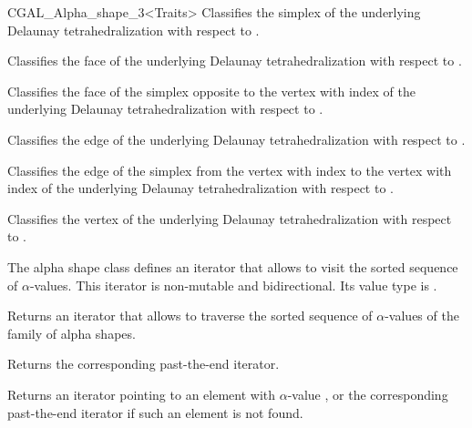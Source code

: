 \begin{ccClassTemplate} {CGAL_Alpha_shape_3<Traits>}
{Classifies the simplex  of the underlying Delaunay tetrahedralization with respect to \ccVar.}

{Classifies the face  of the underlying Delaunay tetrahedralization with respect to \ccVar.}

{Classifies the face of the simplex  opposite to the vertex with index  of the underlying Delaunay tetrahedralization with respect to \ccVar.}

{Classifies the edge  of the underlying Delaunay tetrahedralization with respect to \ccVar.}

{Classifies the edge of the simplex  from the vertex with index  to the vertex with index  of the underlying Delaunay tetrahedralization with respect to \ccVar.}

{Classifies the vertex  of the underlying Delaunay tetrahedralization with respect to \ccVar.}



\smallskip
The alpha shape class defines an iterator that allows to visit the
sorted sequence of $\alpha$-values. This iterator is
non-mutable and bidirectional. Its value type is
.

{Returns an iterator that allows to traverse the
sorted sequence of $\alpha$-values of the family of alpha shapes.}

{Returns the corresponding past-the-end iterator.}

{Returns an iterator pointing to an element with $\alpha$-value
, or the corresponding past-the-end iterator if such 
an element is not found.}


\end{ccClassTemplate}
